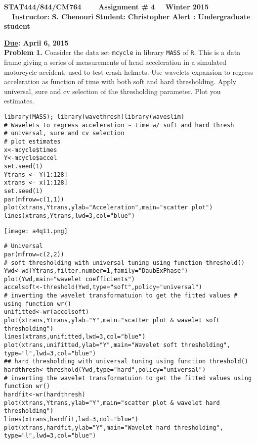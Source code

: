 \documentclass[11pt]{report}
\begin{document}
\begin{center}
{\bf STAT444/844/CM764 ~~~ Assignment \# 4 ~~Winter 2015 ~~Instructor: S. Chenouri}
{\bf Student: Christopher Alert : Undergraduate student}
\end{center} 
\noindent
{\bf \underline {Due}: April 6, 2015}\\

\noindent
{\bf Problem 1.} Consider the data set {\tt mcycle} in library {\tt MASS} of {\tt R}. This is a data frame giving a series of measurements of head acceleration in a simulated motorcycle accident, used to test crash helmets. Use wavelets expansion to regress acceleration as function of time with both soft and hard thresholding. Apply universal, sure and cv selection of the thresholding parameter. Plot you estimates.  \\

\begin{verbatim}
library(MASS); library(wavethresh)library(waveslim)
# Wavelets to regress acceleration ~ time w/ soft and hard thresh
# universal, sure and cv selection
# plot estimates
x<-mcycle$times
Y<-mcycle$accel
set.seed(1)
Ytrans <- Y[1:128]
xtrans <- x[1:128]
set.seed(1)
par(mfrow=c(1,1))
plot(xtrans,Ytrans,ylab="Acceleration",main="scatter plot")
lines(xtrans,Ytrans,lwd=3,col="blue")
\end{verbatim}

\texttt{[image: a4q11.png]}

\begin{verbatim}
# Universal
par(mfrow=c(2,2))
# soft thresholding with universal tuning using function threshold() 
Ywd<-wd(Ytrans,filter.number=1,family="DaubExPhase")
plot(Ywd,main="wavelet coefficients")
accelsoft<-threshold(Ywd,type="soft",policy="universal")
# inverting the wavelet transformatuion to get the fitted values # using function wr()
unifitted<-wr(accelsoft)
plot(xtrans,Ytrans,ylab="Y",main="scatter plot & wavelet soft thresholding")
lines(xtrans,unifitted,lwd=3,col="blue")
plot(xtrans,unifitted,ylab="Y",main="Wavelet soft thresholding", type="l",lwd=3,col="blue")
## hard thresholding with universal tuning using function threshold() 
hardthresh<-threshold(Ywd,type="hard",policy="universal")
# inverting the wavelet transformatuion to get the fitted values using function wr() 
hardfit<-wr(hardthresh)
plot(xtrans,Ytrans,ylab="Y",main="scatter plot & wavelet hard thresholding") 
lines(xtrans,hardfit,lwd=3,col="blue")
plot(xtrans,hardfit,ylab="Y",main="Wavelet hard thresholding", type="l",lwd=3,col="blue")
\end{verbatim}
\end{document}

